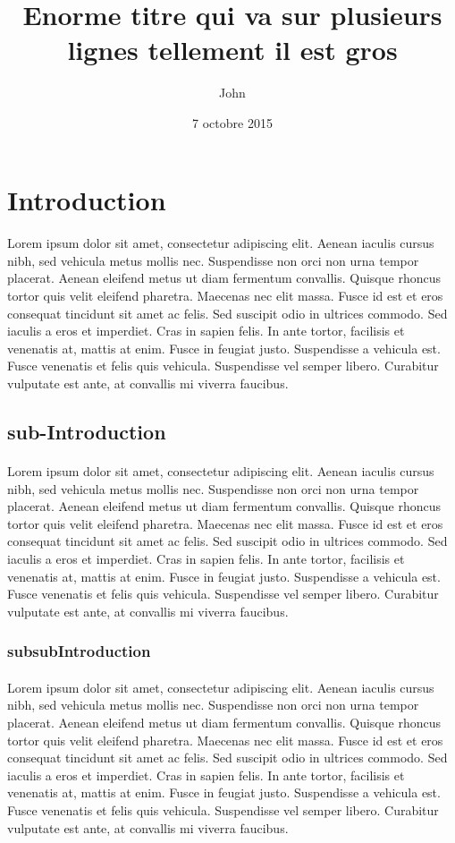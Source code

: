 \documentclass[11pt]{metabo}
\title{Enorme titre qui va sur plusieurs lignes tellement il est gros}
\author{John \bsc{Doe}}
\date{7 octobre 2015}
\begin{document}
\maketitle
\tableofcontents

\section{Introduction}
\paragraph{}Lorem ipsum dolor sit amet, consectetur adipiscing elit. Aenean iaculis cursus nibh, sed vehicula metus mollis nec. Suspendisse non orci non urna tempor placerat. Aenean eleifend metus ut diam fermentum convallis. Quisque rhoncus tortor quis velit eleifend pharetra. Maecenas nec elit massa. Fusce id est et eros consequat tincidunt sit amet ac felis. Sed suscipit odio in ultrices commodo. Sed iaculis a eros et imperdiet. Cras in sapien felis. In ante tortor, facilisis et venenatis at, mattis at enim. Fusce in feugiat justo. Suspendisse a vehicula est. Fusce venenatis et felis quis vehicula. Suspendisse vel semper libero. Curabitur vulputate est ante, at convallis mi viverra faucibus.
\subsection{sub-Introduction}
\paragraph{}Lorem ipsum dolor sit amet, consectetur adipiscing elit. Aenean iaculis cursus nibh, sed vehicula metus mollis nec. Suspendisse non orci non urna tempor placerat. Aenean eleifend metus ut diam fermentum convallis. Quisque rhoncus tortor quis velit eleifend pharetra. Maecenas nec elit massa. Fusce id est et eros consequat tincidunt sit amet ac felis. Sed suscipit odio in ultrices commodo. Sed iaculis a eros et imperdiet. Cras in sapien felis. In ante tortor, facilisis et venenatis at, mattis at enim. Fusce in feugiat justo. Suspendisse a vehicula est. Fusce venenatis et felis quis vehicula. Suspendisse vel semper libero. Curabitur vulputate est ante, at convallis mi viverra faucibus.
\subsubsection{subsubIntroduction}
\paragraph{}Lorem ipsum dolor sit amet, consectetur adipiscing elit. Aenean iaculis cursus nibh, sed vehicula metus mollis nec. Suspendisse non orci non urna tempor placerat. Aenean eleifend metus ut diam fermentum convallis. Quisque rhoncus tortor quis velit eleifend pharetra. Maecenas nec elit massa. Fusce id est et eros consequat tincidunt sit amet ac felis. Sed suscipit odio in ultrices commodo. Sed iaculis a eros et imperdiet. Cras in sapien felis. In ante tortor, facilisis et venenatis at, mattis at enim. Fusce in feugiat justo. Suspendisse a vehicula est. Fusce venenatis et felis quis vehicula. Suspendisse vel semper libero. Curabitur vulputate est ante, at convallis mi viverra faucibus.
\end{document}
